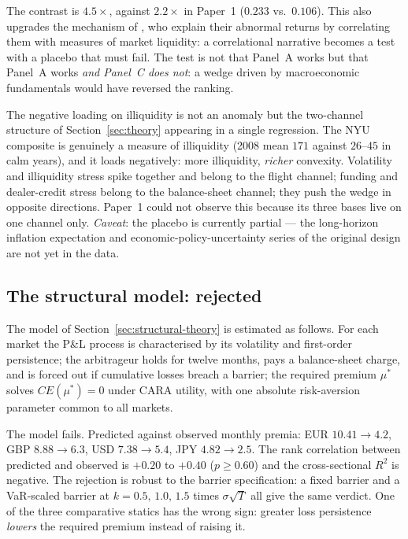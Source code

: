 \documentclass[11pt]{article}
\begin{document}
The contrast is $4.5\times$, against $2.2\times$ in Paper~1 ($0.233$ vs.\ $0.106$). This also upgrades the mechanism of \citet{rr2021}, who explain their abnormal returns by correlating them with measures of market liquidity: a correlational narrative becomes a test with a placebo that must fail. The test is not
that Panel~A works but that Panel~A works \emph{and Panel~C does not}: a wedge driven by macroeconomic
fundamentals would have reversed the ranking.

The negative loading on illiquidity is not an anomaly but the two-channel structure of
Section~\ref{sec:theory} appearing in a single regression. The NYU composite is genuinely a measure of
illiquidity (2008 mean $171$ against $26$--$45$ in calm years), and it loads negatively: more
illiquidity, \emph{richer} convexity. Volatility and illiquidity stress spike together and belong to
the flight channel; funding and dealer-credit stress belong to the balance-sheet channel; they push the
wedge in opposite directions. Paper~1 could not observe this because its three bases live on one
channel only. \emph{Caveat}: the placebo is currently partial --- the long-horizon inflation
expectation and economic-policy-uncertainty series of the original design are not yet in the data.

\subsection{The structural model: rejected}\label{sec:structural}
The model of Section~\ref{sec:structural-theory} is estimated as follows. For each market the P\&L
process is characterised by its volatility and first-order persistence; the arbitrageur holds for
twelve months, pays a balance-sheet charge, and is forced out if cumulative losses breach a barrier;
the required premium $\mu^\ast$ solves $CE(\mu^\ast)=0$ under CARA utility, with one absolute
risk-aversion parameter common to all markets.

The model fails. Predicted against observed monthly premia: EUR $10.41 \to 4.2$, GBP $8.88 \to 6.3$,
USD $7.38 \to 5.4$, JPY $4.82 \to 2.5$. The rank correlation between predicted and observed is $+0.20$
to $+0.40$ ($p \geq 0.60$) and the cross-sectional $R^2$ is negative. The rejection is robust to the
barrier specification: a fixed barrier and a VaR-scaled barrier at $k=0.5,\,1.0,\,1.5$ times
$\sigma\sqrt{T}$ all give the same verdict. One of the three comparative statics has the wrong sign:
greater loss persistence \emph{lowers} the required premium instead of raising it.
\end{document}
